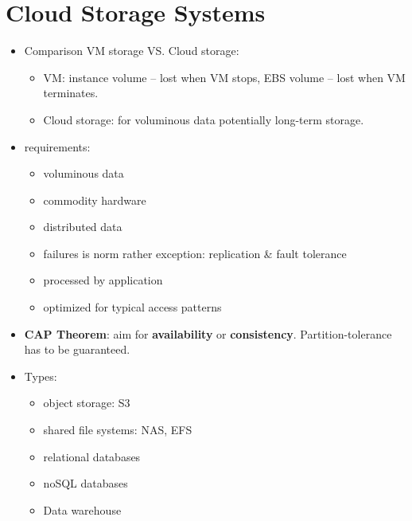 \section{Cloud Storage Systems}
\begin{itemize}
	\item Comparison VM storage VS. Cloud storage:
	\begin{itemize}
		\item VM: instance volume -- lost when VM stops, EBS volume -- lost when VM terminates.
		\item Cloud storage: for voluminous data potentially long-term storage.
	\end{itemize}
	\item requirements:
	\begin{itemize}
		\item voluminous data
		\item commodity hardware
		\item distributed data
		\item failures is norm rather exception: replication \& fault tolerance
		\item processed by application
		\item optimized for typical access patterns
	\end{itemize}
	\item \textbf{CAP Theorem}: aim for \textbf{availability} or \textbf{consistency}. Partition-tolerance has to be guaranteed.
	\item Types:
	\begin{itemize}
		\item object storage: S3
		\item shared file systems: NAS, EFS
		\item relational databases
		\item noSQL databases
		\item Data warehouse
	\end{itemize}
\end{itemize}

